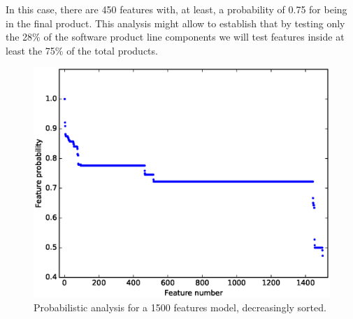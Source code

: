 In this case, there are 450 features with, at least, a probability of 0.75 for being in the final product. This analysis 
might allow to establish that by testing only the 28\% of the software product line components we will test 
features inside at least the 75\% of the total products.

\begin{figure}[h]
	\centering
	\linefigure
	\includegraphics[width=0.8\hsize,angle=0]{plot_probs_probs_sorted.eps}
	\linefigure
	\caption{Probabilistic analysis for a 1500 features model, decreasingly sorted.}\label{fig:plot:probs:probs:sorted}
\end{figure}



